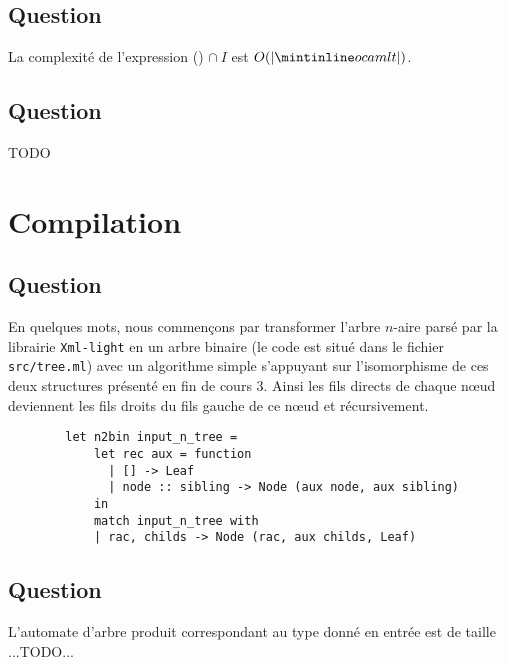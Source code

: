 \documentclass[twoside,12pt]{article}
\begin{document}
\subsection{Question}

La complexité de l'expression () $\cap\ I$ est $O(|\ocaml{t}|)$.

\subsection{Question} TODO


\section{Compilation}
\subsection{Question}
En quelques mots, nous commençons par transformer l'arbre $n$-aire parsé
par la librairie \texttt{Xml-light} en un arbre binaire (le code est situé
dans le fichier \texttt{src/tree.ml}) avec un algorithme simple s'appuyant
sur l'isomorphisme de ces deux structures présenté en fin de cours 3. Ainsi
les fils directs de chaque n\oe{}ud deviennent les fils droits du fils gauche
de ce n\oe{}ud et récursivement.

\begin{verbatim}
        let n2bin input_n_tree =
            let rec aux = function
              | [] -> Leaf
              | node :: sibling -> Node (aux node, aux sibling)
            in
            match input_n_tree with
            | rac, childs -> Node (rac, aux childs, Leaf)
\end{verbatim}


\subsection{Question}
L'automate d'arbre produit correspondant au type donné en entrée est de taille ...TODO...

\end{document}
